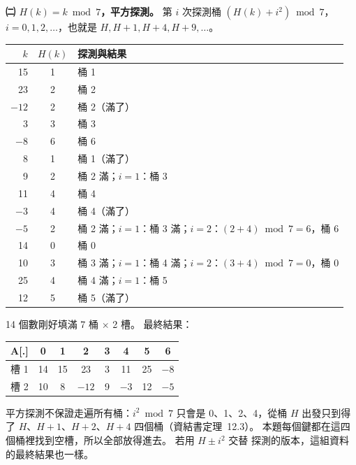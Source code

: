 \begin{pastsoln}
\textbf{㈡ $H(k) = k \bmod 7$，平方探測。} 第 $i$ 次探測桶 $(H(k) + i^2) \bmod 7$，$i = 0, 1, 2, \dots$，也就是
$H, H+1, H+4, H+9, \dots$。
\begin{center}
\small
\begin{tabular}{rcl}
\toprule
$k$ & $H(k)$ & 探測與結果 \\
\midrule
15 & 1 & 桶 1 \\
23 & 2 & 桶 2 \\
$-12$ & 2 & 桶 2（滿了） \\
3 & 3 & 桶 3 \\
$-8$ & 6 & 桶 6 \\
8 & 1 & 桶 1（滿了） \\
9 & 2 & 桶 2 滿；$i = 1$：桶 3 \\
11 & 4 & 桶 4 \\
$-3$ & 4 & 桶 4（滿了） \\
$-5$ & 2 & 桶 2 滿；$i=1$：桶 3 滿；$i=2$：$(2+4) \bmod 7 = 6$，桶 6 \\
14 & 0 & 桶 0 \\
10 & 3 & 桶 3 滿；$i=1$：桶 4 滿；$i=2$：$(3+4) \bmod 7 = 0$，桶 0 \\
25 & 4 & 桶 4 滿；$i=1$：桶 5 \\
12 & 5 & 桶 5（滿了） \\
\bottomrule
\end{tabular}
\end{center}
14 個數剛好填滿 7 桶 $\times$ 2 槽。 最終結果：
\begin{center}
\begin{tabular}{|c|*{7}{c|}}
\hline
A[.] & 0 & 1 & 2 & 3 & 4 & 5 & 6 \\
\hline
槽 1 & 14 & 15 & 23 & 3 & 11 & 25 & $-8$ \\
\hline
槽 2 & 10 & 8 & $-12$ & 9 & $-3$ & 12 & $-5$ \\
\hline
\end{tabular}
\end{center}
平方探測不保證走遍所有桶：$i^2 \bmod 7$ 只會是 0、1、2、4，從桶 $H$ 出發只到得了 $H$、$H+1$、$H+2$、$H+4$
四個桶（資結書定理~12.3）。 本題每個鍵都在這四個桶裡找到空槽，所以全部放得進去。 若用 $H \pm i^2$ 交替
探測的版本，這組資料的最終結果也一樣。
\end{pastsoln}
